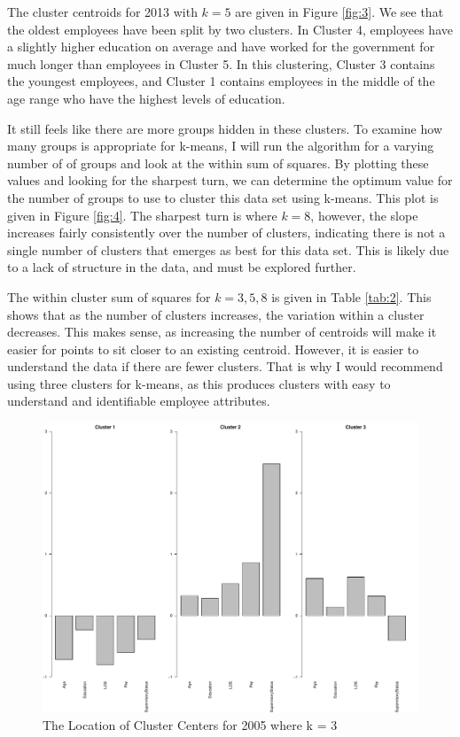 \documentclass{article}
\begin{document}
    \par
    The cluster centroids for 2013 with $k = 5$ are given in Figure \ref{fig:3}. We see that the oldest employees have been split by two clusters. In Cluster 4, employees have a slightly higher education on average and have worked for the government for much longer than employees in Cluster 5. In this clustering, Cluster 3 contains the youngest employees, and Cluster 1 contains employees in the middle of the age range who have the highest levels of education.
    \par
    It still feels like there are more groups hidden in these clusters. To examine how many groups is appropriate for k-means, I will run the algorithm for a varying number of of groups and look at the within sum of squares. By plotting these values and looking for the sharpest turn, we can determine the optimum value for the number of groups to use to cluster this data set using k-means. This plot is given in Figure \ref{fig:4}. The sharpest turn is where $k = 8$, however, the slope increases fairly consistently over the number of clusters, indicating there is not a single number of clusters that emerges as best for this data set. This is likely due to a lack of structure in the data, and must be explored further.
    \par
    The within cluster sum of squares for $k = 3, 5, 8$ is given in Table \ref{tab:2}. This shows that as the number of clusters increases, the variation within a cluster decreases. This makes sense, as increasing the number of centroids will make it easier for points to sit closer to an existing centroid. However, it is easier to understand the data if there are fewer clusters. That is why I would recommend using three clusters for k-means, as this produces clusters with easy to understand and identifiable employee attributes.

    \begin{center}
        \begin{figure}
            \includegraphics[scale=0.4]{./images/3-cluster-center-2005.pdf}
            \caption{The Location of Cluster Centers for 2005 where k = 3}
            \label{fig:1}
        \end{figure}
    \end{center}
\end{document}
